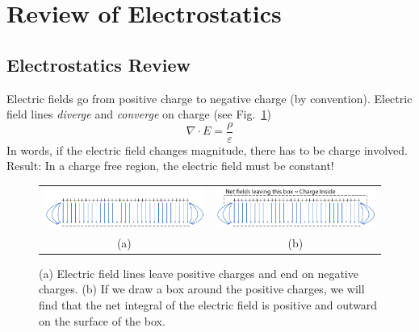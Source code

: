 \section{Review of Electrostatics}










\subsection{Electrostatics Review }
 
Electric fields go from positive charge to negative charge (by convention).   Electric field lines \textit{diverge} and \textit{converge} on charge (see Fig.~\ref{fig:mod2-2_ICtech_sld_11})
%
\begin{equation} 
	\nabla  \cdot E = \frac{\rho }{\varepsilon } 
\end{equation}
%
In words, if the electric field changes magnitude, there has to be charge involved.
 Result: In a charge free region, the electric field must be constant!


\begin{figure}[tb]
\begin{center}
\begin{tabular}{cc}
\includegraphics[width=.5\columnwidth]{charge_fields} &
\includegraphics[width=.5\columnwidth]{charge_fields_guass} \\
(a) & (b) \\
\end{tabular}
\end{center}
\caption{(a) Electric field lines leave positive charges and end on negative charges.  (b) If we draw a box around the positive charges, we will find that the net integral of the electric field is positive and outward on the surface of the box.} \label{fig:mod2-2_ICtech_sld_11}
\end{figure}

